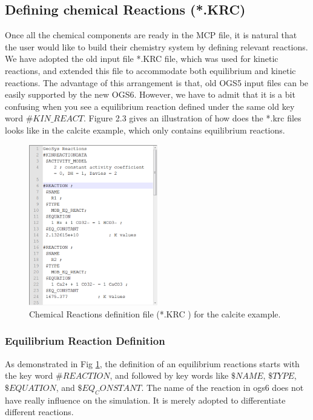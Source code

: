 \subsection{Defining chemical Reactions (*.KRC)}

Once all the chemical components are ready in the MCP file, it is natural that the user would like to build their chemistry system by defining relevant reactions. We have adopted the old input file *.KRC file, which was used for kinetic reactions, and extended this file to accommodate both equilibrium and kinetic reactions. The advantage of this arrangement is that, old OGS5 input files can be easily supported by the new OGS6. However, we have to admit that it is a bit confusing when you see a equilibrium reaction defined under the same old key word $\#KIN\_REACT$. Figure 2.3 gives an illustration of how does the *.krc files looks like in the calcite example, which only contains equilibrium reactions. 

\begin{figure}
\includegraphics[width=0.5\textwidth]{RT/figs/RT_fig_krc_file}
\caption{Chemical Reactions definition file (*.KRC ) for the calcite example. }
\label{fig:RT_krc_file}
\end{figure}

\subsubsection{Equilibrium Reaction Definition}

As demonstrated in Fig \ref{fig:RT_krc_file}, the definition of an equilibrium reactions starts with the key word $\#REACTION$, and followed by key words like $\$NAME$, $\$TYPE$, $\$EQUATION$, and $\$EQ_CONSTANT$.  The name of the reaction in ogs6 does not have really influence on the simulation. It is merely adopted to differentiate different reactions. 

